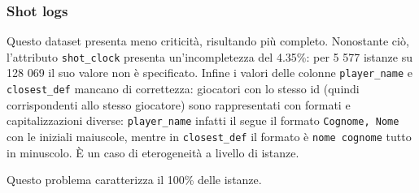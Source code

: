 \subsubsection{Shot logs}

Questo dataset presenta meno criticità, risultando più completo. Nonostante ciò, l’attributo \texttt{shot\_clock} presenta un’incompletezza del 4.35\%: per 5 577 istanze su 128 069 il suo valore non è specificato.
Infine i valori delle colonne \texttt{player\_name} e \texttt{closest\_def} mancano di correttezza: giocatori con lo stesso id (quindi corrispondenti allo stesso giocatore) sono rappresentati con formati e capitalizzazioni diverse: \texttt{player\_name} infatti il segue il formato \texttt{Cognome, Nome} con le iniziali maiuscole, mentre in \texttt{closest\_def} il formato è \texttt{nome cognome} tutto in minuscolo. È un caso di eterogeneità a livello di istanze.

\par
Questo problema caratterizza il 100\% delle istanze.
